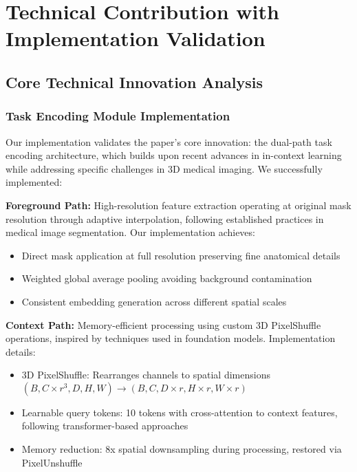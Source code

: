 \section{Technical Contribution with Implementation Validation}
\label{sec:technical_contribution}

\subsection{Core Technical Innovation Analysis}

\subsubsection*{Task Encoding Module Implementation}
Our implementation validates the paper's core innovation: the dual-path task encoding architecture, which builds upon recent advances in in-context learning while addressing specific challenges in 3D medical imaging. We successfully implemented:

\textbf{Foreground Path:} High-resolution feature extraction operating at original mask resolution through adaptive interpolation, following established practices in medical image segmentation. Our implementation achieves:
\begin{itemize}
    \item Direct mask application at full resolution preserving fine anatomical details
    \item Weighted global average pooling avoiding background contamination
    \item Consistent embedding generation across different spatial scales
\end{itemize}

\textbf{Context Path:} Memory-efficient processing using custom 3D PixelShuffle operations, inspired by techniques used in foundation models. Implementation details:
\begin{itemize}
    \item 3D PixelShuffle: Rearranges channels to spatial dimensions $(B, C \times r^3, D, H, W) \rightarrow (B, C, D \times r, H \times r, W \times r)$
    \item Learnable query tokens: 10 tokens with cross-attention to context features, following transformer-based approaches
    \item Memory reduction: 8x spatial downsampling during processing, restored via PixelUnshuffle
\end{itemize}

